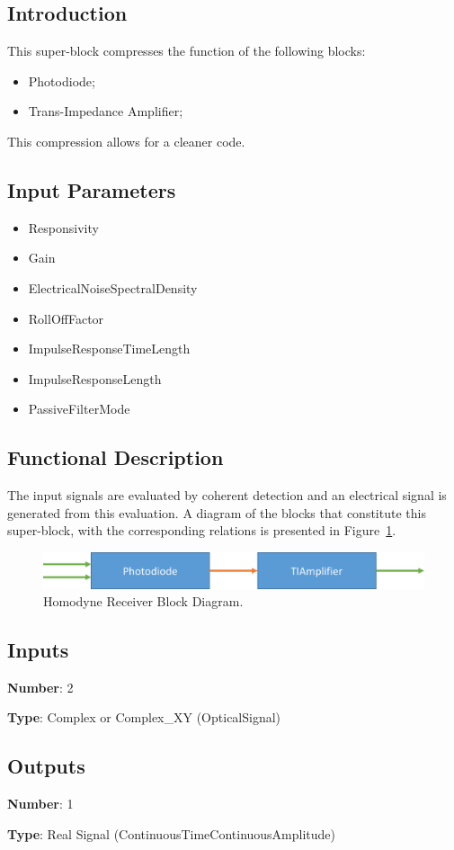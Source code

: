 \documentclass[../../sdf/tex/BPSK_system.tex]{subfiles}
\date{}
\begin{document}
\onlyinsubfile{\maketitle}

\subsection*{Introduction}

This super-block compresses the function of the following blocks:
\begin{itemize}
\item Photodiode;
\item Trans-Impedance Amplifier;
\end{itemize}
\noindent
This compression allows for a cleaner code. 

\subsection*{Input Parameters}

\begin{itemize}
	\item Responsivity
	\item Gain
	\item ElectricalNoiseSpectralDensity
	\item RollOffFactor
	\item ImpulseResponseTimeLength
	\item ImpulseResponseLength
	\item PassiveFilterMode
\end{itemize}

\subsection*{Functional Description}

The input signals are evaluated by coherent detection and an electrical signal is generated from this evaluation. A diagram of the blocks that constitute this super-block, with the corresponding relations is presented in Figure~\ref{fig:physicalsystem}.

\begin{figure}[H]
\centering
\includegraphics[width=\linewidth]{blockdiagram_reciever.png}
\caption{Homodyne Receiver Block Diagram.}
\label{fig:physicalsystem}
\end{figure}

\subsection*{Inputs}

\textbf{Number}: 2

\textbf{Type}: Complex or Complex\_XY (OpticalSignal)

\subsection*{Outputs}

\textbf{Number}: 1

\textbf{Type}: Real Signal (ContinuousTimeContinuousAmplitude)
\end{document}
